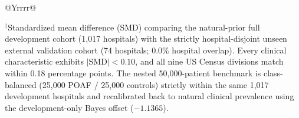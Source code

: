 \begin{table}[t]
\begin{tabularx}{\textwidth}{@{}Yrrrr@{}}
\bottomrule
\end{tabularx}
\par\smallskip\raggedright\fontsize{7.5}{9.4}\selectfont\color{sub}
$^{\dagger}$Standardized mean difference (SMD) comparing the natural-prior full development cohort (1,017 hospitals) with the strictly hospital-disjoint unseen external validation cohort (74 hospitals; 0.0\% hospital overlap). Every clinical characteristic exhibits $|\mathrm{SMD}| < 0.10$, and all nine US Census divisions match within 0.18 percentage points. The nested 50,000-patient benchmark is class-balanced (25,000 POAF / 25,000 controls) strictly within the same 1,017 development hospitals and recalibrated back to natural clinical prevalence using the development-only Bayes offset ($-1.1365$).
\end{table}
